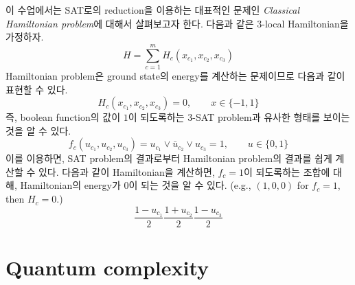 이 수업에서는 SAT로의 reduction을 이용하는 대표적인 문제인 \textit{Classical Hamiltonian problem}에 대해서 살펴보고자 한다. 다음과 같은 3-local Hamiltonian을 가정하자.
\begin{equation*}
    H=\sum_{c=1}^m H_c\left(x_{c_1}, x_{c_2}, x_{c_3}\right)
\end{equation*}
Hamiltonian problem은 ground state의 energy를 계산하는 문제이므로 다음과 같이 표현할 수 있다.
\begin{equation*}
    H_c\left(x_{c_1}, x_{c_2}, x_{c_3}\right)=0,\qquad x \in \{-1, 1\}
\end{equation*}
즉, boolean function의 값이 $1$이 되도록하는 3-SAT problem과 유사한 형태를 보이는 것을 알 수 있다. 
\begin{equation*}
    f_c\left(u_{c_1}, u_{c_2}, u_{c_3}\right) = u_{c_1} \vee \bar{u}_{c_2} \vee u_{c_3} = 1,\qquad u \in \{0, 1\}
\end{equation*}
이를 이용하면, SAT problem의 결과로부터 Hamiltonian problem의 결과를 쉽게 계산할 수 있다. 다음과 같이 Hamiltonian을 계산하면, $f_c = 1$이 되도록하는 조합에 대해, Hamiltonian의 energy가 0이 되는 것을 알 수 있다. (e.g., $(1, 0, 0)$ for $f_c = 1$, then $H_c = 0$.)
\begin{equation*}
    \frac{1-u_{c_1}}{2} \frac{1+u_{c_2}}{2} \frac{1-u_{c_3}}{2}
\end{equation*}

\section{Quantum complexity}
